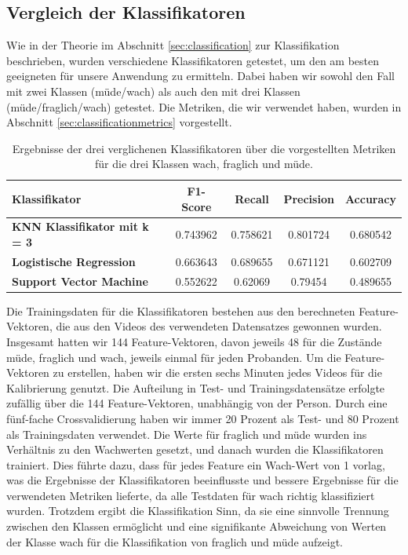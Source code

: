 \subsection{Vergleich der Klassifikatoren}
\label{subsec:classificatorcomparison}
Wie in der Theorie im Abschnitt \ref{sec:classification} zur Klassifikation beschrieben, wurden verschiedene Klassifikatoren getestet, um den am besten geeigneten für unsere Anwendung zu ermitteln. Dabei haben wir sowohl den Fall mit zwei Klassen (müde/wach) als auch den mit drei Klassen (müde/fraglich/wach) getestet. Die Metriken, die wir verwendet haben, wurden in Abschnitt \ref{sec:classificationmetrics} vorgestellt.

\begin{table}[!htp]
	\centering
	\scriptsize
	\begin{tabular}{lcccc}%
		\textbf{Klassifikator} & \textbf{F1-Score} & \textbf{Recall} & \textbf{Precision} & \textbf{Accuracy} \\\midrule
		\textbf{KNN Klassifikator mit k = 3} & 0.743962 & 0.758621 & 0.801724 & 0.680542 \\
		\textbf{Logistische Regression} & 0.663643 & 0.689655 & 0.671121 & 0.602709 \\
		\textbf{Support Vector Machine} & 0.552622 & 0.62069 & 0.79454 & 0.489655 \\
	\end{tabular}
	\caption{Ergebnisse der drei verglichenen Klassifikatoren über die vorgestellten Metriken für die drei Klassen wach, fraglich und müde.}
	\label{table:threeclassificator}
\end{table}


Die Trainingsdaten für die Klassifikatoren bestehen aus den berechneten Feature-Vektoren, die aus den Videos des verwendeten Datensatzes gewonnen wurden. Insgesamt hatten wir 144 Feature-Vektoren, davon jeweils 48 für die Zustände \glqq müde\grqq{}, \glqq fraglich\grqq{} und \glqq wach\grqq{}, jeweils einmal für jeden Probanden. Um die Feature-Vektoren zu erstellen, haben wir die ersten sechs Minuten jedes Videos für die Kalibrierung genutzt. Die Aufteilung in Test- und Trainingsdatensätze erfolgte zufällig über die 144 Feature-Vektoren, unabhängig von der Person. Durch eine fünf-fache Crossvalidierung haben wir immer 20 Prozent als Test- und 80 Prozent als Trainingsdaten verwendet. Die Werte für \glqq fraglich\grqq{} und \glqq müde\grqq{} wurden ins Verhältnis zu den Wachwerten gesetzt, und danach wurden die Klassifikatoren trainiert. Dies führte dazu, dass für jedes Feature ein Wach-Wert von 1 vorlag, was die Ergebnisse der Klassifikatoren beeinflusste und bessere Ergebnisse für die verwendeten Metriken lieferte, da alle Testdaten für \glqq wach\grqq{} richtig klassifiziert wurden. Trotzdem ergibt die Klassifikation Sinn, da sie eine sinnvolle Trennung zwischen den Klassen ermöglicht und eine signifikante Abweichung von Werten der Klasse \glqq wach\grqq{} für die Klassifikation von \glqq fraglich\grqq{} und \glqq müde\grqq{} aufzeigt.

